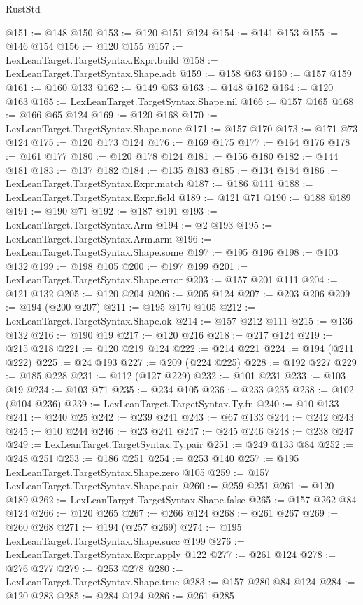 \begin{lexlean}{RustStd}
\begin{coremodule}
@151 := @148 @150
@153 := @120 @151 @124
@154 := @141 @153
@155 := @146 @154
@156 := @120 @155
@157 := LexLeanTarget.TargetSyntax.Expr.build
@158 := LexLeanTarget.TargetSyntax.Shape.adt
@159 := @158 @63
@160 := @157 @159
@161 := @160 @133
@162 := @149 @63
@163 := @148 @162
@164 := @120 @163
@165 := LexLeanTarget.TargetSyntax.Shape.nil
@166 := @157 @165
@168 := @166 @65 @124
@169 := @120 @168
@170 := LexLeanTarget.TargetSyntax.Shape.none
@171 := @157 @170
@173 := @171 @73 @124
@175 := @120 @173 @124
@176 := @169 @175
@177 := @164 @176
@178 := @161 @177
@180 := @120 @178 @124
@181 := @156 @180
@182 := @144 @181
@183 := @137 @182
@184 := @135 @183
@185 := @134 @184
@186 := LexLeanTarget.TargetSyntax.Expr.match
@187 := @186 @111
@188 := LexLeanTarget.TargetSyntax.Expr.field
@189 := @121 @71
@190 := @188 @189
@191 := @190 @71
@192 := @187 @191
@193 := LexLeanTarget.TargetSyntax.Arm
@194 := @2 @193
@195 := LexLeanTarget.TargetSyntax.Arm.arm
@196 := LexLeanTarget.TargetSyntax.Shape.some
@197 := @195 @196
@198 := @103 @132
@199 := @198 @105
@200 := @197 @199
@201 := LexLeanTarget.TargetSyntax.Shape.error
@203 := @157 @201 @111
@204 := @121 @132
@205 := @120 @204
@206 := @205 @124
@207 := @203 @206
@209 := @194 (@200 @207)
@211 := @195 @170 @105
@212 := LexLeanTarget.TargetSyntax.Shape.ok
@214 := @157 @212 @111
@215 := @136 @132
@216 := @190 @19
@217 := @120 @216
@218 := @217 @124
@219 := @215 @218
@221 := @120 @219 @124
@222 := @214 @221
@224 := @194 (@211 @222)
@225 := @24 @193
@227 := @209 (@224 @225)
@228 := @192 @227
@229 := @185 @228
@231 := @112 (@127 @229)
@232 := @101 @231
@233 := @103 @19
@234 := @103 @71
@235 := @234 @105
@236 := @233 @235
@238 := @102 (@104 @236)
@239 := LexLeanTarget.TargetSyntax.Ty.fn
@240 := @10 @133
@241 := @240 @25
@242 := @239 @241
@243 := @67 @133
@244 := @242 @243
@245 := @10 @244
@246 := @23 @241
@247 := @245 @246
@248 := @238 @247
@249 := LexLeanTarget.TargetSyntax.Ty.pair
@251 := @249 @133 @84
@252 := @248 @251
@253 := @186 @251
@254 := @253 @140
@257 := @195 LexLeanTarget.TargetSyntax.Shape.zero @105
@259 := @157 LexLeanTarget.TargetSyntax.Shape.pair
@260 := @259 @251
@261 := @120 @189
@262 := LexLeanTarget.TargetSyntax.Shape.false
@265 := @157 @262 @84 @124
@266 := @120 @265
@267 := @266 @124
@268 := @261 @267
@269 := @260 @268
@271 := @194 (@257 @269)
@274 := @195 LexLeanTarget.TargetSyntax.Shape.succ @199
@276 := LexLeanTarget.TargetSyntax.Expr.apply @122
@277 := @261 @124
@278 := @276 @277
@279 := @253 @278
@280 := LexLeanTarget.TargetSyntax.Shape.true
@283 := @157 @280 @84 @124
@284 := @120 @283
@285 := @284 @124
@286 := @261 @285

\end{coremodule}
\end{lexlean}
